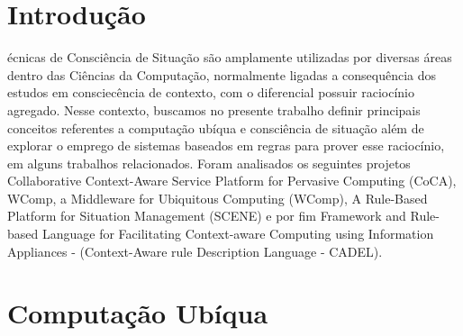 \documentclass[12pt,a4paper,compsoc]{IEEEtran}
\begin{document}
\maketitle



\section{Introdução}


écnicas de Consciência de Situação são amplamente utilizadas por diversas áreas dentro das Ciências da Computação, normalmente ligadas a consequência dos estudos em consciecência de contexto, com o diferencial possuir raciocínio agregado. 
Nesse contexto, buscamos no presente trabalho definir principais conceitos referentes a computação ubíqua e consciência de situação além de explorar o emprego de sistemas baseados em regras para prover esse raciocínio, em alguns trabalhos relacionados.
Foram analisados os seguintes projetos Collaborative Context-Aware Service Platform for Pervasive Computing (CoCA), WComp, a Middleware for Ubiquitous Computing (WComp), A Rule-Based Platform for Situation Management (SCENE) e por fim Framework and Rule-based Language for Facilitating Context-aware Computing using Information Appliances - (Context-Aware rule Description Language - CADEL).


\section{Computação Ubíqua}
\end{document}
